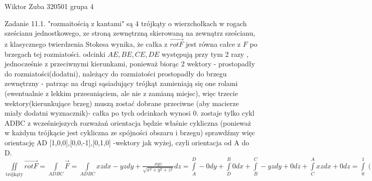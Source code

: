 \documentclass{article}
\begin{document}
Wiktor Zuba 320501 grupa 4
\newline

Zadanie 11.1.
\newline
\newline
"rozmaitością z kantami" są 4 trójkąty o wierzchołkach w rogach sześcianu jednostkowego, ze stroną zewnętrzną skierowaną na zewnątrz sześcianu,
z klasycznego twierdzenia Stokesa wynika, że całka z $\overrightarrow{rotF}$ jest równa całce z $F$ po brzegach tej rozmiatości.\newline
odcinki $AE,BE,CE,DE$ występują przy tym 2 razy , jednocześnie z przeciwnymi kierunkami, ponieważ biorąc 2 wektory - prostopadły do rozmiatości(dodatni),
należący do rozmiatości prostopadły do brzegu zewnętrzny - patrząc na drugi sąsiadujący trójkąt zamieniają się one rolami
(ewentualnie z lekkim przesuniąciem, ale nie z zamianą miejsc), więc trzecie wektory(kierunkujące brzeg) muszą zostać dobrane przeciwne
(aby macierze miały dodatni wyznacznik)- całka po tych odcinkach wynosi 0.\newline
zostaje tylko cykl ADBC z wcześniejszych rozważań orientacja będzie właśnie cykliczna (ponieważ w każdym trójkącie jest cykliczna ze spójności obszaru i brzegu)
sprawdźmy więc orientację AD [1,0,0],[0,0,-1],[0,1,0] -wektory jak wyżej, czyli orientacja od A do D.\newline
$
\iint\limits_{\text{trójkąty}}\overrightarrow{rotF}=\int\limits_{ADBC}\overrightarrow{F}=\int\limits_{ADBC}xzdx-yzdy+\frac{xyz}{\sqrt{x^2+y^2+z^2}}dz=
\int\limits_{A}^{D}-0dy+\int\limits_{D}^{B}0dx+\int\limits_{B}^{C}-yzdy+0dz+\int\limits_{C}^{A}xzdx+0dz=
\int\limits_{0}^{1}(1-z)zdz+\int\limits_{0}^{1}(1-x)xdx=2\int\limits_{0}^{1}(x-x^2)dx=2(\frac{1}{2}-\frac{1}{3})=\underline{\frac{1}{3}}
$
\newline
\newline
\end{document}
